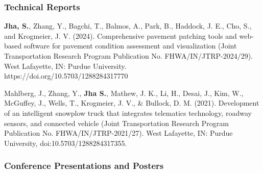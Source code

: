 \documentclass[10pt]{article}
\begin{document}
\vspace{1 em}

\subsubsection{Technical Reports}
\begin{enumerate}[label={[\arabic*]}, leftmargin=3em, itemsep=0pt, topsep=0pt]
    \item \textbf{Jha, S.}, Zhang, Y., Bagchi, T., Balmos, A., Park, B., Haddock, J. E., Cho, S., and Krogmeier, J. V. (2024). Comprehensive pavement patching tools and web-based software for pavement condition assessment and visualization (Joint Transportation Research Program Publication No. FHWA/IN/JTRP-2024/29). West Lafayette, IN: Purdue University. \\https://doi.org/10.5703/1288284317770

    \item Mahlberg, J., Zhang, Y., \textbf{Jha S.}, Mathew, J. K., Li, H., Desai, J., Kim, W., McGuffey, J., Wells, T., Krogmeier, J. V., \& Bullock, D. M. (2021). Development of an intelligent snowplow truck that integrates telematics technology, roadway sensors, and connected vehicle (Joint Transportation Research Program Publication No. FHWA/IN/JTRP-2021/27). West Lafayette, IN: Purdue University, doi:10.5703/1288284317355.

\end{enumerate}
\vspace{1 em}
\subsubsection{Conference Presentations and Posters}
\end{document}
